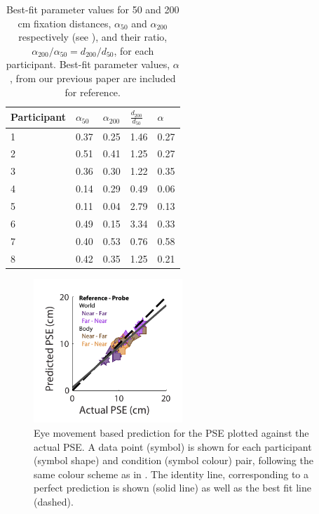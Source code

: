 \begin{table}
    \begin{tabular}{l|lll|l}
	Participant & $\alpha_{50}$ & $\alpha_{200}$ & $\frac{d_{200}}{d_{50}}$ & $\alpha$ \\
    \hline
	1 & 0.37 & 0.25 & 1.46 & 0.27 \\
	2 & 0.51 & 0.41 & 1.25 & 0.27 \\
	3 & 0.36 & 0.30 & 1.22 & 0.35 \\
	4 & 0.14 & 0.29 & 0.49 & 0.06 \\
	5 & 0.11 & 0.04 & 2.79 & 0.13 \\
	6 & 0.49 & 0.15 & 3.34 & 0.33\\
	7 & 0.40 & 0.53 & 0.76 & 0.58 \\
	8 & 0.42 & 0.35 & 1.25 & 0.21 \\
    \end{tabular}

    \caption{Best-fit parameter values for 50 and 200 \si{\centi\metre} fixation distances, $\alpha_{50}$ and $\alpha_{200}$ respectively (see ), and their ratio, $\alpha_{200} / \alpha_{50} = d_{200} / d_{50}$, for each participant. Best-fit parameter values, $\alpha$, from our previous paper \protect\cite{clemens2015a} are included for reference.}

    \label{p4:tab2}
\end{table}

\begin{figure}
    \includegraphics[width=0.5\textwidth]{src/paper4/p4_figure4.pdf}

	\caption{Eye movement based prediction for the PSE plotted against the actual PSE. A data point (symbol) is shown for each participant (symbol shape) and condition (symbol colour) pair, following the same colour scheme as in . The identity line, corresponding to a perfect prediction is shown (solid line) as well as the best fit line (dashed).}
	\label{p4:fig4}
\end{figure}

